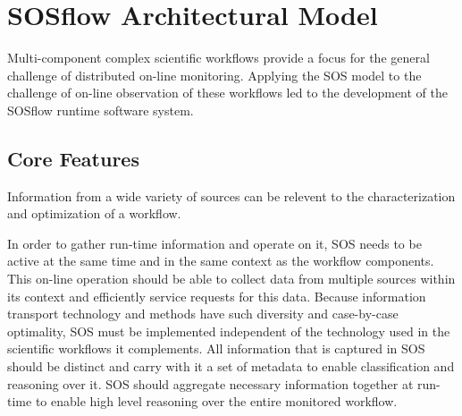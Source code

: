 
\section{SOSflow Architectural Model}
%
%
Multi-component complex scientific workflows provide a focus for the
general challenge of distributed on-line monitoring.
%
Applying the SOS model to the challenge of on-line observation 
of these workflows led to the development of the SOSflow runtime software system.
%
\subsection{Core Features}
%
Information from a wide variety of sources can be relevent to the
characterization and optimization of a workflow.
%
\par
%
In order to gather run-time information and operate on it, SOS needs
to be active at the same time and in the same context as the workflow
components.
%
This on-line operation should be able to collect data from multiple
sources within its context and efficiently service requests
for this data.
%
Because information transport technology and methods have such
diversity and case-by-case optimality, SOS must be implemented
independent of the technology used in the scientific workflows it
complements.
%
All information that is captured in SOS should be distinct and carry
with it a set of metadata to enable classification and reasoning over
it.
%
SOS should aggregate necessary information together at run-time to
enable high level reasoning over the entire monitored workflow.
%
\par
%
%
